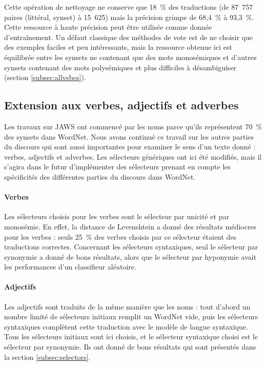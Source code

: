 Cette opération de nettoyage ne conserve que 18~\% des traductions (de 87~757 paires (littéral, synset) à 15~625) mais la précision grimpe de 68,4~\% à 93,3~\%. Cette ressource à haute précision peut être utilisée comme donnée d'entraînement. Un défaut classique des méthodes de vote est de ne choisir que des exemples faciles et peu intéressants, mais la ressource obtenue ici est équilibrée entre les synsets ne contenant que des mots monosémiques et d'autres synsets contenant des mots polysémiques et plus difficiles à désambiguïser (section \ref{subsec:allvsbcs}).

\subsection{Extension aux verbes, adjectifs et adverbes}
\label{sec:extending_jaws}

Les travaux sur JAWS ont commencé par les noms parce qu'ils représentent 70~\% des synsets dans WordNet. Nous avons continué ce travail sur les autres parties du discours qui sont aussi importantes pour examiner le sens d'un texte donné : verbes, adjectifs et adverbes. Les sélecteurs génériques ont ici été modifiés, mais il s'agira dans le futur d'implémenter des sélecteurs prenant en compte les spécificités des différentes parties du discours dans WordNet.

\paragraph{Verbes}
Les sélecteurs choisis pour les verbes sont le sélecteur par unicité et par monosémie. En effet, la distance de Levenshtein a donné des résultats médiocres pour les verbes : seuls 25~\% des verbes choisis par ce sélecteur étaient des traductions correctes. Concernant les sélecteurs syntaxiques, seul le sélecteur par synonymie a donné de bons résultats, alors que le sélecteur par hyponymie avait les performances d'un classifieur aléatoire.

\paragraph{Adjectifs}
Les adjectifs sont traduits de la même manière que les noms : tout d'abord un nombre limité de sélecteurs initiaux remplit un WordNet vide, puis les sélecteurs syntaxiques complètent cette traduction avec le modèle de langue syntaxique. Tous les sélecteurs initiaux sont ici choisis, et le sélecteur syntaxique choisi est le sélecteur par synonymie. Ils ont donné de bons résultats qui sont présentés dans la section \ref{subsec:selectors}.

